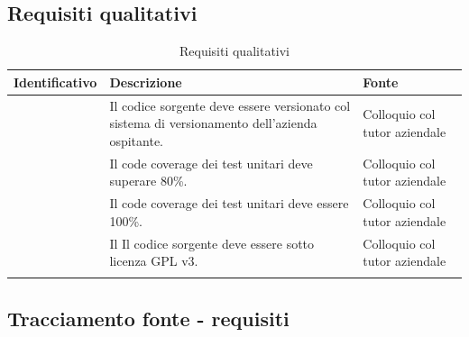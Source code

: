 \subsection{Requisiti qualitativi}\label{subsec:requisiti-qualitativi}
\renewcommand{\arraystretch}{1.5}
\begin{center}
    \begin{longtable}{ | c| C{7cm} |C{3cm} |}
        \hline
        \textbf{Identificativo} & \textbf{Descrizione} &\textbf{Fonte}\\\hline
        &Il codice sorgente deve essere versionato col sistema di versionamento dell'azienda ospitante. &Colloquio col tutor aziendale \\\hline
        &Il code coverage dei test unitari deve superare 80\%.& Colloquio col tutor aziendale\\\hline
        &Il code coverage dei test unitari deve essere 100\%.& Colloquio col tutor aziendale\\\hline
        &Il Il codice sorgente deve essere sotto licenza GPL v3.& Colloquio col tutor aziendale\\\hline
        \caption{Requisiti qualitativi}
    \end{longtable}
\end{center}
\setcounter{subCount}{0}
\setcounter{rowcount}{0}
\subsection{Tracciamento fonte - requisiti}\label{subsec:tracciamento-fonte---requisiti}

